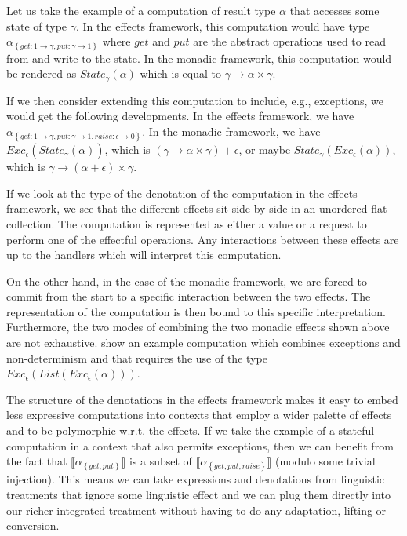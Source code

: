 \documentclass{article}
\newcommand{\sem}[1]{\llbracket #1 \rrbracket}
\begin{document}
Let us take the example of a computation of result type $\alpha$ that accesses
some state of type $\gamma$. In the effects framework, this computation would
have type $\alpha_{\left\{get : 1 \to \gamma, put : \gamma \to 1\right\}}$
where $get$ and $put$ are the abstract operations used to read from and write
to the state. In the monadic framework, this computation would be rendered as
$State_\gamma(\alpha)$ which is equal to $\gamma \to \alpha \times \gamma$.

If we then consider extending this computation to include, e.g., exceptions,
we would get the following developments. In the effects framework, we have
$\alpha_{\left\{get : 1 \to \gamma, put : \gamma \to 1, raise : \epsilon \to
  0\right\}}$. In the monadic framework, we have
$Exc_\epsilon(State_\gamma(\alpha))$, which is $(\gamma \to \alpha \times
\gamma) + \epsilon$, or maybe $State_\gamma(Exc_\epsilon(\alpha))$, which is
$\gamma \to (\alpha + \epsilon) \times \gamma$.

If we look at the type of the denotation of the computation in the effects
framework, we see that the different effects sit side-by-side in an unordered
flat collection. The computation is represented as either a value or a request
to perform one of the effectful operations. Any interactions between these
effects are up to the handlers which will interpret this computation.

On the other hand, in the case of the monadic framework, we are forced to
commit from the start to a specific interaction between the two effects. The
representation of the computation is then bound to this specific
interpretation. Furthermore, the two modes of combining the two monadic
effects shown above are not exhaustive. \citet{kiselyov2013extensible} show an
example computation which combines exceptions and non-determinism and that
requires the use of the type $Exc_\epsilon(List(Exc_\epsilon(\alpha)))$.

The structure of the denotations in the effects framework makes it easy to
embed less expressive computations into contexts that employ a wider palette
of effects and to be polymorphic w.r.t. the effects. If we take the example of
a stateful computation in a context that also permits exceptions, then we can
benefit from the fact that $\sem{\alpha_{\left\{get, put\right\}}}$ is a
subset of $\sem{\alpha_{\left\{get, put, raise\right\}}}$ (modulo some trivial
injection). This means we can take expressions and denotations from linguistic
treatments that ignore some linguistic effect and we can plug them directly
into our richer integrated treatment without having to do any adaptation,
lifting or conversion.
\end{document}
